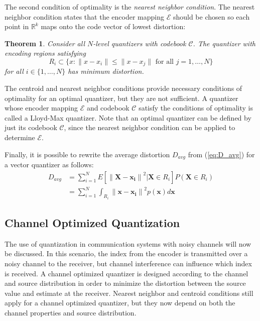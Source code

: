 \documentclass[10pt]{article}
\newtheorem{theorem}{Theorem}[section]
\begin{document}
The second condition of optimality is the \emph{nearest neighbor condition}. The nearest neighbor condition states that the encoder mapping $\mathcal{E}$ should be chosen so each point in $\mathbb{R}^k$ maps onto the code vector of lowest distortion:

\begin{theorem}
Consider all $N$-level quantizers with codebook $\mathcal{C}$. The quantizer with encoding regions satisfying
\begin{equation}
R_i \subset \{x : \| x - x_i \| \le \| x - x_j \| \text{ for all } j = 1,\ldots,N \}
\end{equation}
for all $i \in \{1,\ldots,N\}$ has minimum distortion.
\end{theorem}

The centroid and nearest neighbor conditions provide necessary conditions of optimality for an optimal quantizer, but they are not sufficient. A quantizer whose encoder mapping $\mathcal{E}$ and codebook $\mathcal{C}$ satisfy the conditions of optimality is called a Lloyd-Max quantizer. Note that an optimal quantizer can be defined by just its codebook $\mathcal{C}$, since the nearest neighbor condition can be applied to determine $\mathcal{E}$.

Finally, it is possible to rewrite the average distortion $D_{avg}$ from (\ref{eq:D_avg}) for a vector quantizer as follows:
\begin{align}
D_{avg} &= \sum_{i=1}^{N} E[ {\| \mathbf{X} -  \mathbf{x_i}\|}^2 | \mathbf{X} \in R_i] P(\mathbf{X} \in R_i) \\
&= \sum_{i=1}^{N} \int_{R_i} {\|\mathbf{x} - \mathbf{x_i}\|}^2 p(\mathbf{x}) d\mathbf{x}
\end{align}

\subsection{Channel Optimized Quantization}
\label{sec:channel_optimized}
The use of quantization in communication systems with noisy channels will now be discussed. In this scenario, the index from the encoder is transmitted over a noisy channel to the receiver, but channel interference can influence which index is received. A channel optimized quantizer is designed according to the channel and source distribution in order to minimize the distortion between the source value and estimate at the receiver. Nearest neighbor and centroid conditions still apply for a channel optimized quantizer, but they now depend on both the channel properties and source distribution.
\end{document}
